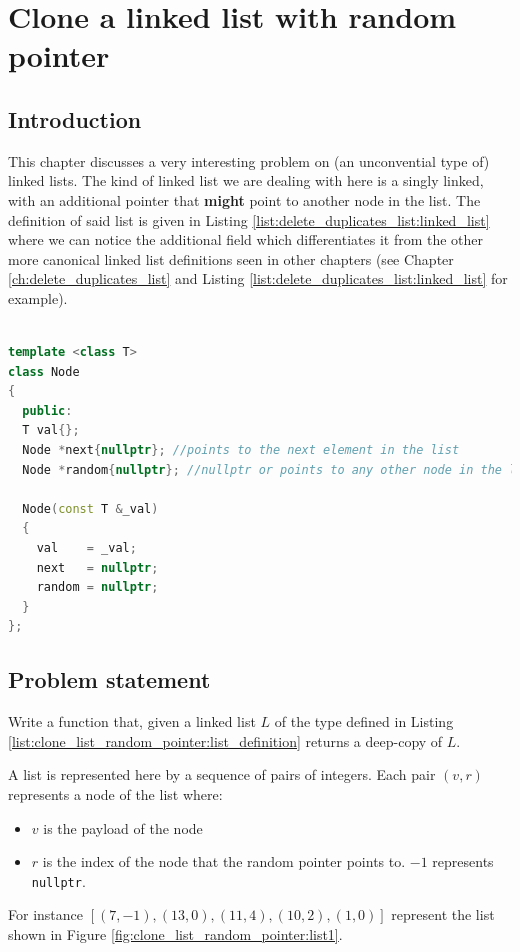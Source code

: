 %

\chapter{Clone a linked list with random pointer}
\label{ch:clone_list_random_pointer}
\section*{Introduction}
This chapter discusses a very interesting problem on (an unconvential type of) linked lists.
The kind of linked list we are dealing with here is a singly linked, with an additional pointer that \textbf{might} point to another node in the list. 
The \CC definition of said list is given in Listing \ref{list:delete_duplicates_list:linked_list} where we can notice the additional field  which differentiates it from the other more canonical linked list definitions seen in other chapters (see Chapter \ref{ch:delete_duplicates_list} and Listing \ref{list:delete_duplicates_list:linked_list} for example).

\begin{lstlisting}[language=c++, caption={Definition of a linked list with a pointer to a \textit{random} node.},label=list:delete_duplicates_list:linked_list]

template <class T> 
class Node
{
  public:
  T val{};
  Node *next{nullptr}; //points to the next element in the list
  Node *random{nullptr}; //nullptr or points to any other node in the list.

  Node(const T &_val)
  {
    val    = _val;
    next   = nullptr;
    random = nullptr;
  }
};
\end{lstlisting}

\section{Problem statement}
\begin{exercise}
Write a function that, given a linked list $L$ of the type defined in Listing \ref{list:clone_list_random_pointer:list_definition} returns a deep-copy of $L$.


A list is represented here by a sequence of pairs of integers. Each pair $(v,r)$ represents a node of the list where:
\begin{itemize}
	\item $v$ is the payload of the node
	\item $r$ is the index of the node that the random pointer points to. $-1$ represents \lstinline[columns=fixed]{nullptr}.
\end{itemize} 
For instance $[(7,-1),(13,0),(11,4),(10,2),(1,0)]$ represent the list shown in Figure \ref{fig:clone_list_random_pointer:list1}.
\end{exercise}

